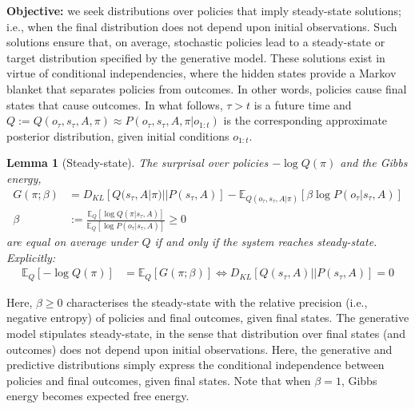 \documentclass[review,12pt,authoryear]{elsarticle}
\newtheorem{lemma}[theorem]{Lemma}
\begin{document}
\textbf{Objective:} we seek distributions over policies that imply steady-state solutions; i.e., when the final distribution does not depend upon initial observations. Such solutions ensure that, on average, stochastic policies lead to a steady-state or target distribution specified by the generative model. These solutions exist in virtue of conditional independencies, where the hidden states provide a Markov blanket that separates policies from outcomes. In other words, policies cause final states that cause outcomes. In what follows, $\tau >t$ is a future time and $Q:=Q(o_\tau, s_\tau, A, \pi) \approx P(o_\tau, s_\tau, A, \pi|o_{1:t})$ is the corresponding approximate posterior distribution, given initial conditions $o_{1:t}$.

\begin{lemma}[Steady-state]
\label{lemma:steady-state}
The surprisal over policies $-\log Q(\pi)$ and the Gibbs energy,
\begin{align}
    G(\pi; \beta) &= D_{KL}[Q(s_\tau, A|\pi)||P(s_\tau,A)]-\mathbb E_{Q(o_\tau, s_\tau, A|\pi)} [\beta \log P(o_\tau |s_\tau, A)] \\
    \beta &:= \frac{\mathbb E_Q[\log Q(\pi|s_\tau,A)]}{\mathbb E_Q[\log P(o_\tau|s_\tau,A)]} \geq 0
\end{align}
are equal on average under $Q$ if and only if the system reaches steady-state. Explicitly:
\begin{align}
    \mathbb E_Q[-\log Q(\pi)]&= \mathbb E_Q[G(\pi; \beta)] \iff D_{KL}[Q(s_\tau, A) ||P(s_\tau, A)]=0
\end{align}
\end{lemma}

Here, $\beta \geq 0$ characterises the steady-state with the relative precision (i.e., negative entropy) of policies and final outcomes, given final states. The generative model stipulates steady-state, in the sense that distribution over final states (and outcomes) does not depend upon initial observations. Here, the generative and predictive distributions simply express the conditional independence between policies and final outcomes, given final states. Note that when $\beta = 1$, Gibbs energy becomes expected free energy.
\end{document}

